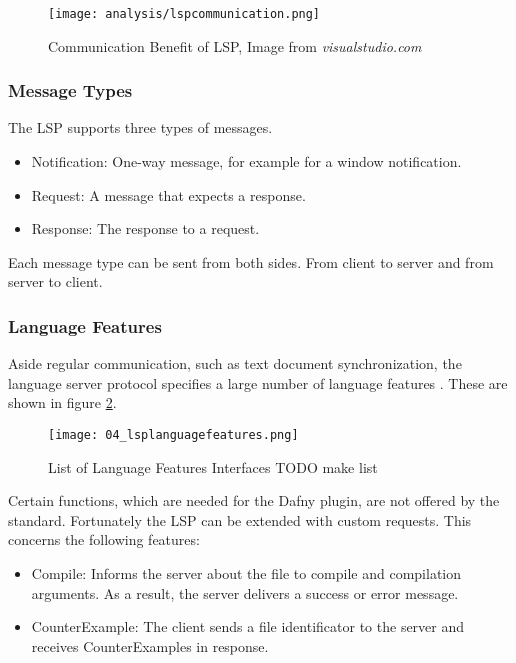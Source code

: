 \begin{figure}[H]
    \centering
    \texttt{[image: analysis/lspcommunication.png]}
    \caption{Communication Benefit of LSP, Image from \textit{visualstudio.com} \cite{lspextensionguide}}
    \label{fig:lspcommunication}
\end{figure}

\subsubsection{Message Types}
The LSP supports three types of messages.
\begin{itemize}
    \item Notification: One-way message, for example for a window notification.
    \item Request: A message that expects a response.
    \item Response: The response to a request.
\end{itemize}
Each message type can be sent from both sides. From client to server and from server to client.

\subsubsection{Language Features}
Aside regular communication, such as text document synchronization,
the language server protocol specifies a large number of language features \cite{lspspec}.
These are shown in figure \ref{fig:lsplanguagefeatures}.

\begin{figure}[H]
    \centering
    \texttt{[image: 04\_lsplanguagefeatures.png]}
    \caption{List of Language Features Interfaces TODO make list}
    \label{fig:lsplanguagefeatures}
\end{figure}

Certain functions, which are needed for the Dafny plugin, are not offered by the standard.
Fortunately the LSP can be extended with custom requests. This concerns the following features:
\begin{itemize}
    \item Compile: Informs the server about the file to compile and compilation arguments.
          As a result, the server delivers a success or error message.
    \item CounterExample: The client sends a file identificator to the server and receives
           CounterExamples in response.
\end{itemize}

